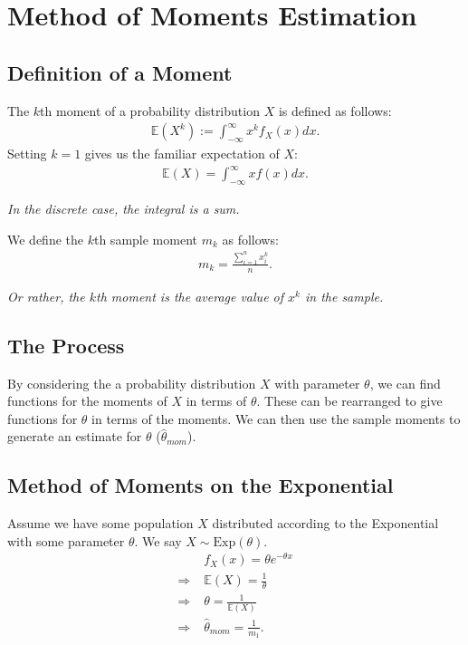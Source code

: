 \documentclass[a4paper, 12pt, twoside]{article}
\begin{document}
\section{Method of Moments Estimation}

\subsection{Definition of a Moment}

The $k$th moment of a probability distribution $X$ is defined as
follows:
\begin{align*}
    \mathbb{E}(X^k) := \int_{-\infty}^{\infty} x^k f_X(x) dx.
\end{align*}
Setting $k = 1$ gives us the familiar expectation of $X$:
\begin{align*}
    \mathbb{E}(X) = \int_{-\infty}^{\infty} x f(x) dx.
\end{align*}

\textit{In the discrete case, the integral is a sum.}

\vspace{\baselineskip}

We define the $k$th sample moment $m_k$ as follows:
\begin{align*}
    m_k = \frac{\sum_{i = 1}^{n} x_i^k}{n}.
\end{align*}

\textit{Or rather, the $k$th moment is the average value of $x^k$
    in the sample.}

\subsection{The Process}

By considering the a probability distribution $X$ with parameter $\theta$,
we can find functions for the moments of $X$ in terms of $\theta$. These
can be rearranged to give functions for $\theta$ in terms of the
moments. We can then use the sample moments to generate an estimate
for $\theta$ ($\hat\theta_{mom}$).

\subsection{Method of Moments on the Exponential}

Assume we have some population $X$ distributed according to the
Exponential with some parameter $\theta$. We say
$X \sim \text{Exp}(\theta)$.
\begin{align*}
                   & f_X(x) = \theta e^{-\theta x} \tag{x $>$ 0} \\
    \Rightarrow \; & \mathbb{E}(X) = \frac{1}{\theta}            \\
    \Rightarrow \; & \theta = \frac{1}{\mathbb{E}(X)}            \\
    \Rightarrow \; & \hat{\theta}_{mom} = \frac{1}{m_1}.
\end{align*}
\end{document}
